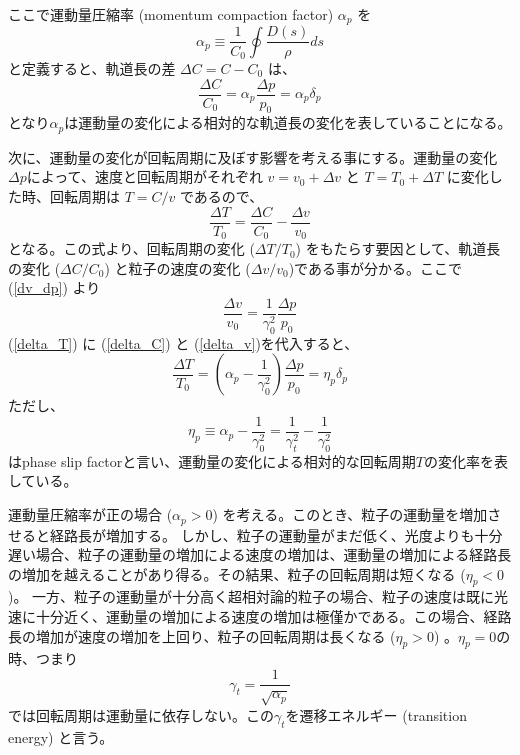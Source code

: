 \documentclass[10pt,a4paper]{ltjsarticle}
\begin{document}
%
ここで運動量圧縮率 (momentum compaction factor) $\alpha_p$ を
%
\begin{equation}
    \alpha_p \equiv \frac{1}{C_0} \oint \frac{D(s)}{\rho} ds
\end{equation}
%
と定義すると、軌道長の差 $\Delta C = C-C_0$ は、
%
\begin{equation}
    \frac{\Delta C}{C_0}=\alpha_p\frac{\Delta p}{p_0}=\alpha_p\delta_p
    \label{delta_C}
\end{equation}
%
となり$\alpha_p$は運動量の変化による相対的な軌道長の変化を表していることになる。

次に、運動量の変化が回転周期に及ぼす影響を考える事にする。運動量の変化$\Delta p$によって、速度と回転周期がそれぞれ $v=v_0+\Delta v$ と $T=T_0+\Delta T$ に変化した時、回転周期は $T=C/v$ であるので、
%
\begin{equation}
    \frac{\Delta T}{T_0} = \frac{\Delta C}{C_0} - \frac{\Delta v}{v_0}
    \label{delta_T}
\end{equation}
%
となる。この式より、回転周期の変化 ($\Delta T/T_0$) をもたらす要因として、軌道長の変化 ($\Delta C/C_0$) と粒子の速度の変化 ($\Delta v/v_0$)である事が分かる。ここで(\ref{dv_dp}) より
%
\begin{equation}
    \frac{\Delta v}{v_0}=\frac{1}{\gamma_0^2}\frac{\Delta p}{p_0}
    \label{delta_v}
\end{equation}
%
(\ref{delta_T}) に (\ref{delta_C}) と (\ref{delta_v})を代入すると、
%
\begin{equation}
    \frac{\Delta T}{T_0} = \left(\alpha_p - \frac{1}{\gamma_0^2}\right)\frac{\Delta p}{p_0} = \eta_p \delta_p
\end{equation}
%
ただし、
%
\begin{equation}
    \eta_p \equiv \alpha_p - \frac{1}{\gamma_0^2} = \frac{1}{\gamma_t^2} - \frac{1}{\gamma_0^2}
    \label{alppha_slip}
\end{equation}
%
はphase slip factorと言い、運動量の変化による相対的な回転周期$T$の変化率を表している。
%

運動量圧縮率が正の場合 ($\alpha_p>0$) を考える。このとき、粒子の運動量を増加させると経路長が増加する。 しかし、粒子の運動量がまだ低く、光度よりも十分遅い場合、粒子の運動量の増加による速度の増加は、運動量の増加による経路長の増加を越えることがあり得る。その結果、粒子の回転周期は短くなる ($\eta_p < 0$)。
一方、粒子の運動量が十分高く超相対論的粒子の場合、粒子の速度は既に光速に十分近く、運動量の増加による速度の増加は極僅かである。この場合、経路長の増加が速度の増加を上回り、粒子の回転周期は長くなる ($\eta_p>0$) 。$\eta_p = 0$の時、つまり
%
\begin{equation}
    \gamma_t = \frac{1}{\sqrt{\alpha_p}}
\end{equation}
%
では回転周期は運動量に依存しない。この$\gamma_t$を遷移エネルギー (transition energy) と言う。
\end{document}
